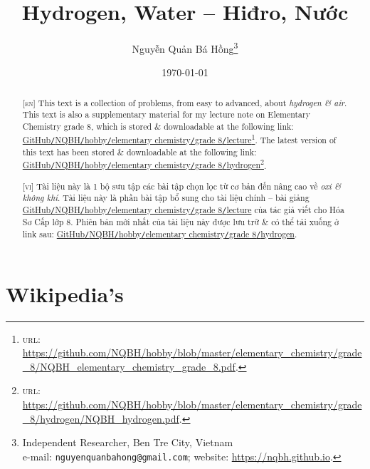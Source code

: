 \documentclass{article}
\title{Hydrogen, Water -- Hiđro, Nước}
\author{Nguyễn Quản Bá Hồng\footnote{Independent Researcher, Ben Tre City, Vietnam\\e-mail: \texttt{nguyenquanbahong@gmail.com}; website: \url{https://nqbh.github.io}.}}
\date{\today}
\begin{document}
\maketitle
\begin{abstract}
	\textsc{[en]} This text is a collection of problems, from easy to advanced, about \textit{hydrogen \& air}. This text is also a supplementary material for my lecture note on Elementary Chemistry grade 8, which is stored \& downloadable at the following link: \href{https://github.com/NQBH/hobby/blob/master/elementary_chemistry/grade_8/NQBH_elementary_chemistry_grade_8.pdf}{GitHub\texttt{/}NQBH\texttt{/}hobby\texttt{/}elementary chemistry\texttt{/}grade 8\texttt{/}lecture}\footnote{\textsc{url}: \url{https://github.com/NQBH/hobby/blob/master/elementary_chemistry/grade_8/NQBH_elementary_chemistry_grade_8.pdf}.}. The latest version of this text has been stored \& downloadable at the following link: \href{https://github.com/NQBH/hobby/blob/master/elementary_chemistry/grade_8/hydrogen/NQBH_hydrogen.pdf}{GitHub\texttt{/}NQBH\texttt{/}hobby\texttt{/}elementary chemistry\texttt{/}grade 8\texttt{/}hydrogen}\footnote{\textsc{url}: \url{https://github.com/NQBH/hobby/blob/master/elementary_chemistry/grade_8/hydrogen/NQBH_hydrogen.pdf}.}.
	\vspace{2mm}
	
	\textsc{[vi]} Tài liệu này là 1 bộ sưu tập các bài tập chọn lọc từ cơ bản đến nâng cao về \textit{oxi \& không khí}. Tài liệu này là phần bài tập bổ sung cho tài liệu chính -- bài giảng \href{https://github.com/NQBH/hobby/blob/master/elementary_chemistry/grade_8/NQBH_elementary_chemistry_grade_8.pdf}{GitHub\texttt{/}NQBH\texttt{/}hobby\texttt{/}elementary chemistry\texttt{/}grade 8\texttt{/}lecture} của tác giả viết cho Hóa Sơ Cấp lớp 8. Phiên bản mới nhất của tài liệu này được lưu trữ \& có thể tải xuống ở link sau: \href{https://github.com/NQBH/hobby/blob/master/elementary_chemistry/grade_8/hydrogen/NQBH_hydrogen.pdf}{GitHub\texttt{/}NQBH\texttt{/}hobby\texttt{/}elementary chemistry\texttt{/}grade 8\texttt{/}hydrogen}.
\end{abstract}
\tableofcontents
\newpage


\section{Wikipedia's}
\end{document}
